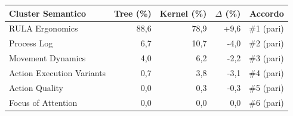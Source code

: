 \begin{tabular*}{\linewidth}{@{}l@{\extracolsep{\fill}}rrrr@{}}
\toprule
\textbf{Cluster Semantico} & \textbf{Tree (\%)} & \textbf{Kernel (\%)} & \textbf{$\Delta$ (\%)} & \textbf{Accordo} \\
\midrule
RULA Ergonomics & 88{,}6 & 78{,}9 & +9{,}6 & \#1 (pari) \\
Process Log & 6{,}7 & 10{,}7 & -4{,}0 & \#2 (pari) \\
Movement Dynamics & 4{,}0 & 6{,}2 & -2{,}2 & \#3 (pari) \\
Action Execution Variants & 0{,}7 & 3{,}8 & -3{,}1 & \#4 (pari) \\
Action Quality & 0{,}0 & 0{,}3 & -0{,}3 & \#5 (pari) \\
Focus of Attention & 0{,}0 & 0{,}0 & 0{,}0 & \#6 (pari) \\
\bottomrule
\end{tabular*}

